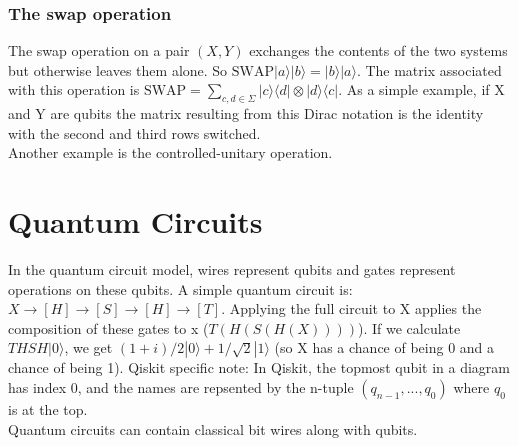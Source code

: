 \documentclass{amsart}
\newcommand{\swap}{\text{SWAP}}
\begin{document}
\subsubsection*{The swap operation}
The swap operation on a pair $ (X,Y) $ exchanges the contents of the two systems but otherwise
leaves them alone. So $ \swap |a \rangle |b \rangle = |b \rangle |a \rangle $. The matrix
associated with this operation is $ \swap = \sum_{c,d \in \Sigma} |c\rangle \langle d| \otimes
|d\rangle \langle c| $. As a simple example, if X and Y are qubits the matrix resulting from
this Dirac notation is the identity with the second and third rows switched. \\
Another example is the controlled-unitary operation.
\section*{Quantum Circuits}
In the quantum circuit model, wires represent qubits and gates represent operations on these
qubits. A simple quantum circuit is:
$ X \to [H] \to [S] \to [H] \to [T] $. Applying the full circuit to X applies the composition
of these gates to x ($ T(H(S(H(X)))) $). If we calculate $ THSH |0\rangle $, we get
$ (1+i)/2 |0\rangle + 1/\sqrt{2} |1\rangle $ (so X has a chance of being 0 and a chance of
being 1).
Qiskit specific note: In Qiskit, the topmost qubit in a diagram has index 0, and the names are
repsented by the n-tuple $ (q_{n-1},...,q_0) $ where $ q_0 $ is at the top. \\
Quantum circuits can contain classical bit wires along with qubits.
\end{document}
